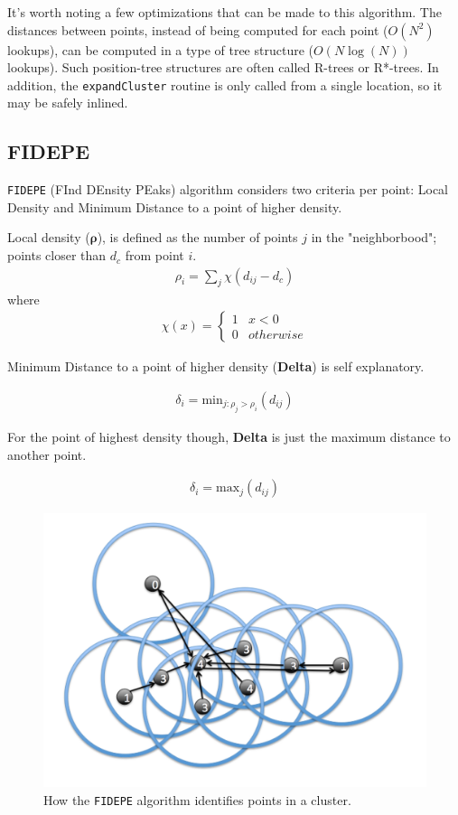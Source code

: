 \documentclass[12pt]{article}
\begin{document}
\par It's worth noting a few optimizations that can be made to this algorithm.
The distances between points, instead of being computed for each point ($O(N^2)$ lookups), can be computed in a type of tree structure ($O(N \log(N))$ lookups). Such position-tree structures are often called R-trees or R*-trees.
In addition, the \texttt{expandCluster} routine is only called from a single location, so it may be safely inlined.

\subsection{FIDEPE}

\texttt{FIDEPE} (FInd DEnsity PEaks) algorithm \cite{FIDEPE} considers two criteria per point: Local Density and Minimum Distance to a point of higher density.

Local density ($\boldsymbol{\rho}$), is defined as the number of points $j$ in the "neighborbood"; points closer than $d_c$ from point $i$.
\begin{align*}
	\rho_i = \sum_j \chi(d_{ij}-d_c)
\end{align*}
where 
\begin{align*}
\chi(x)=
\begin{cases}
1 & x < 0 \\
0 & otherwise
\end{cases}
\end{align*}

Minimum Distance to a point of higher density (\textbf{Delta}) is self explanatory. 

\begin{align*}
	\delta_i = \text{min}_{j:\rho_j > \rho_i} (d_{ij})
\end{align*}

For the point of highest density though, \textbf{Delta} is just the maximum distance to another point.

\begin{align*}
	\delta_i = \text{max}_{j} (d_{ij})
\end{align*}


\begin{figure}[ht]
\centering
\includegraphics[width=0.8\linewidth]{fidepe_plots/FIDEPE}
\caption{How the \texttt{FIDEPE} algorithm identifies points in a cluster.}
\label{fig:FIDEPE}
\end{figure}
\end{document}
